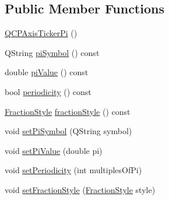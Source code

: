 \subsection*{Public Member Functions}
\begin{DoxyCompactItemize}
\item 
\hyperlink{class_q_c_p_axis_ticker_pi_aa0d7b7034055927c0f0077a2d713d7d0}{Q\+C\+P\+Axis\+Ticker\+Pi} ()
\item 
Q\+String \hyperlink{class_q_c_p_axis_ticker_pi_a2fd785cd66a6f4f969ac2eca1b08e0f2}{pi\+Symbol} () const
\item 
double \hyperlink{class_q_c_p_axis_ticker_pi_abddc18799caa4ae6c721e1e5e229b3a4}{pi\+Value} () const
\item 
bool \hyperlink{class_q_c_p_axis_ticker_pi_aa320edf0a30386ce6a63c18050fbdfd8}{periodicity} () const
\item 
\hyperlink{class_q_c_p_axis_ticker_pi_a262f1534c7f0c79a7d5237f5d1e2c54c}{Fraction\+Style} \hyperlink{class_q_c_p_axis_ticker_pi_ab532d5e838168a8a5bbafea4eafc94be}{fraction\+Style} () const
\item 
void \hyperlink{class_q_c_p_axis_ticker_pi_acfdcd4758a393bde4be12a50fb2017b5}{set\+Pi\+Symbol} (Q\+String symbol)
\item 
void \hyperlink{class_q_c_p_axis_ticker_pi_a36ce0651d2ec92edd36feac1619c2468}{set\+Pi\+Value} (double pi)
\item 
void \hyperlink{class_q_c_p_axis_ticker_pi_a58f538dc01860fb56e46970e28a87f03}{set\+Periodicity} (int multiples\+Of\+Pi)
\item 
void \hyperlink{class_q_c_p_axis_ticker_pi_a760c8af6ca68178e607556c4e5049d71}{set\+Fraction\+Style} (\hyperlink{class_q_c_p_axis_ticker_pi_a262f1534c7f0c79a7d5237f5d1e2c54c}{Fraction\+Style} style)
\end{DoxyCompactItemize}
